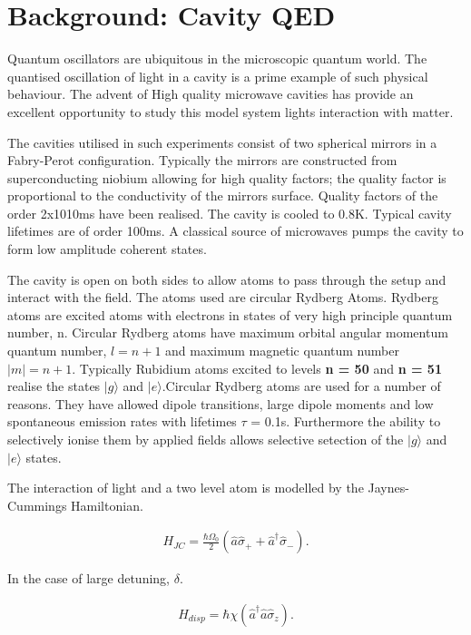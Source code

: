 \documentclass[aps,prl,twocolumn,amsmath,amssymb]{revtex4}
\begin{document}
\section{\label{sec:level2}Background: Cavity QED}

Quantum oscillators are ubiquitous in the microscopic quantum world.  The quantised oscillation of light in a cavity is a prime example of such physical behaviour. The advent of High quality microwave cavities has provide an excellent opportunity to study this model system lights interaction with matter.  

The cavities utilised in such experiments consist of two spherical mirrors in a Fabry-Perot configuration. Typically the mirrors are constructed from superconducting niobium allowing for high quality factors; the quality factor is proportional to the conductivity of the mirrors surface.  Quality factors of the order 2x1010ms have been realised. The cavity is cooled to 0.8K. Typical cavity lifetimes are of order 100ms. A classical source of microwaves pumps the cavity to form low amplitude coherent states.

The cavity is open on both sides to allow atoms to pass through the setup and interact with the field. The atoms used are circular Rydberg Atoms. Rydberg atoms are excited atoms with electrons in states of  very high principle quantum number, n. Circular Rydberg atoms have maximum orbital angular momentum quantum number, $l = n +1$ and maximum magnetic quantum number $|m| = n +1$. Typically Rubidium atoms excited to levels \textbf{n = 50} and \textbf{n = 51} realise the states $|g\rangle$ and $|e\rangle$.Circular Rydberg atoms are used for a number of reasons. They have allowed dipole transitions, large dipole moments and low spontaneous emission rates with lifetimes $\tau$ = 0.1s. Furthermore the ability to selectively ionise them by applied fields allows selective setection of the $|g\rangle$ and $|e\rangle$ states.

The interaction of light and a two level atom is modelled by the Jaynes-Cummings Hamiltonian. 

\begin{align}
 H_{JC} =\frac{\hbar \Omega_0}{2} \left(\hat{a}\hat{\sigma}_+
+\hat{a}^{\dagger}\hat{\sigma}_-\right)
\label{eq:cat1}.
\end{align}

In the case of large detuning, $\delta$.

\begin{align}
H_{disp} = \hbar \chi\left(\hat{a}^{\dagger}\hat{a}\hat{\sigma}_z\right)
\label{eq:cat1}.
\end{align}
\end{document}
